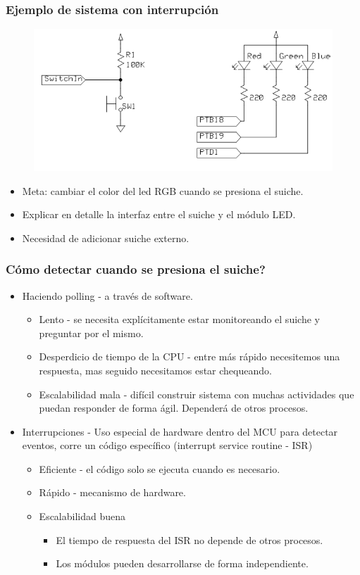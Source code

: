 \documentclass[10.5pt,scale=1.0,t,aspectratio=169,hyperref={pdfpagelabels=false}]{beamer}
\begin{document}
\begin{frame}
	\frametitle{Ejemplo de sistema con interrupción}
	\begin{figure}
		\centering
		\includegraphics[scale=0.6]{01_EjemploInterrupcion}
	\end{figure}
	\begin{itemize}
		\item Meta: cambiar el color del led RGB cuando se presiona el suiche.
		\item Explicar en detalle la interfaz entre el suiche y el módulo LED.
		\item Necesidad de adicionar suiche externo. 
	\end{itemize}
\end{frame}
\begin{frame}
	\frametitle{Cómo detectar cuando se presiona el suiche?}
	\begin{itemize}
		\item Haciendo polling - a través de software.
		\begin{itemize}
			\item Lento - se necesita explícitamente estar monitoreando el suiche y preguntar por el mismo.
			\item Desperdicio de tiempo de la CPU - entre más rápido necesitemos una respuesta, mas seguido necesitamos estar chequeando. 
			\item Escalabilidad mala - difícil construir sistema con muchas actividades que puedan responder de forma ágil. Dependerá de otros procesos.
		\end{itemize}
		\item Interrupciones - Uso especial de hardware dentro del MCU para detectar eventos, corre un código específico (interrupt service routine - ISR)
		\begin{itemize}
			\item Eficiente - el código solo se ejecuta cuando es necesario.
			\item Rápido - mecanismo de hardware.
			\item Escalabilidad buena
			\begin{itemize}
				\item El tiempo de respuesta del ISR no depende de otros procesos. 
				\item Los módulos pueden desarrollarse de forma independiente. 
			\end{itemize}
		\end{itemize}
	\end{itemize}
\end{frame}
\end{document}
